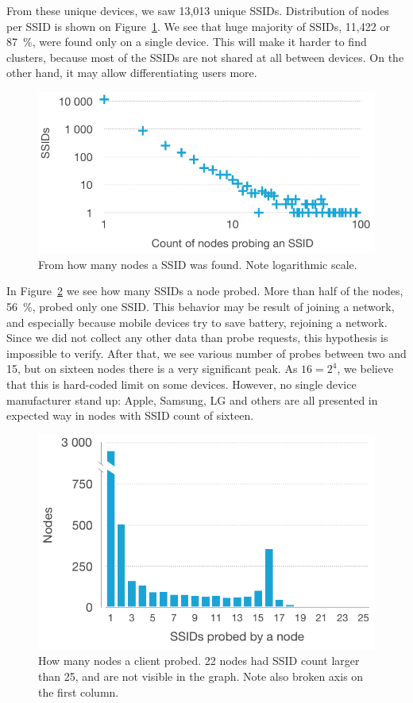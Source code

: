 \documentclass[12pt,a4paper,oneside,pdftex]{report}
\begin{document}
From these unique devices, we saw 13,013 unique SSIDs. Distribution of nodes per SSID is shown on Figure~\ref{fig:nodes_per_ssid}. We see that huge majority of SSIDs, 11,422 or 87~\%, were found only on a single device. This will make it harder to find clusters, because most of the SSIDs are not shared at all between devices. On the other hand, it may allow differentiating users more.

\begin{figure}
    \center
    \includegraphics{images/nodes_per_ssid}
    \caption{From how many nodes a SSID was found. Note logarithmic scale.}
    \label{fig:nodes_per_ssid}
\end{figure}

In Figure~\ref{fig:ssids_per_node} we see how many SSIDs a node probed. More than half of the nodes, 56~\%, probed only one SSID. This behavior may be result of joining a network, and especially because mobile devices try to save battery, rejoining a network. Since we did not collect any other data than probe requests, this hypothesis is impossible to verify. After that, we see various number of probes between two and 15, but on sixteen nodes there is a very significant peak. As $16 = 2^4$, we believe that this is hard-coded limit on some devices. However, no single device manufacturer stand up: Apple, Samsung, LG and others are all presented in expected way in nodes with SSID count of sixteen.

\begin{figure}
    \center
    \includegraphics{images/ssids_per_node}
    \caption{How many nodes a client probed. 22 nodes had SSID count larger than 25, and are not visible in the graph. Note also broken axis on the first column.}
    \label{fig:ssids_per_node}
\end{figure}
\end{document}
